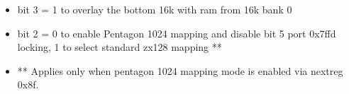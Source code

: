 \begin{itemize}
\item[] bit 3 = 1 to overlay the bottom 16k with ram from 16k bank 0
\item[] bit 2 = 0 to enable Pentagon 1024 mapping and disable bit 5 port
0x7ffd locking, 1 to select standard zx128 mapping **
\item[] ** Applies only when pentagon 1024 mapping mode is enabled via
nextreg 0x8f.
\end{itemize}

